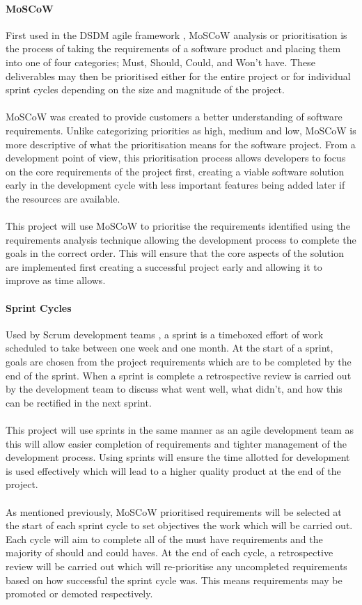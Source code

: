 		\paragraph{MoSCoW}
			First used in the DSDM agile framework \citep{bittner2002use}, MoSCoW analysis or prioritisation is the process of taking the requirements of a software product and placing them into one of four categories; Must, Should, Could, and Won’t have. These deliverables may then be prioritised either for the entire project or for individual sprint cycles depending on the size and magnitude  of the project.
			\\\\
			MoSCoW was created to provide customers a better understanding of software requirements. Unlike  categorizing priorities as high, medium and low,  MoSCoW is more descriptive of what the prioritisation means for the software project. From a development point of view, this prioritisation process allows developers to focus on the core requirements of the project first, creating a viable software solution early in the development cycle with less important features being added later if the resources are available.
			\\\\
			This project  will use MoSCoW to prioritise the requirements identified using the requirements analysis technique allowing the development process to complete the goals in the correct order. This will ensure that the core aspects of the solution are implemented first creating a successful project early and allowing it to improve as time allows.
		\paragraph{Sprint Cycles}
			Used by Scrum development teams \citep{rising2000scrum}, a sprint is a timeboxed effort of work scheduled to take between one week and one month. At the start of a sprint, goals are chosen from the project requirements which are to be completed by the end of the sprint. When a sprint is complete a retrospective review is carried out by the development team to discuss what went well, what didn’t, and how this can be rectified in  the next sprint.
			\\\\
			This project will use sprints in the same manner as an agile development team as this will allow easier completion of requirements and tighter management of the development process. Using sprints will ensure the time allotted for development is used effectively which will lead to a higher quality product at the end of the project. 
			\\\\
			As mentioned previously, MoSCoW prioritised requirements will be selected at the start of each sprint cycle to set objectives the work which will be carried out. Each cycle will aim to complete all of the must have requirements and the majority of should and could haves. At the end of each cycle, a retrospective review will be carried out which will re-prioritise any  uncompleted requirements based on how successful the sprint cycle was. This means requirements may be promoted or demoted respectively.
